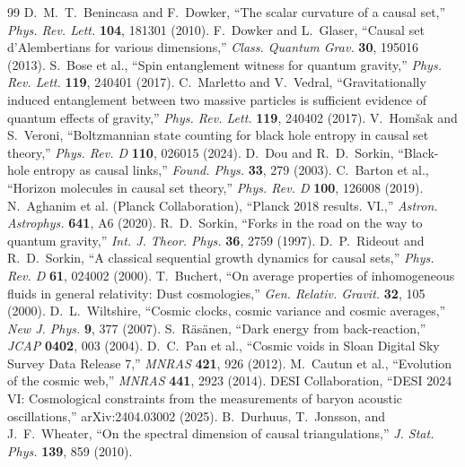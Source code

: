 \documentclass[11pt]{article}
\begin{document}
\begin{thebibliography}{99}
 D.~M.~T.~Benincasa and F.~Dowker, ``The scalar curvature of a causal set,'' \emph{Phys. Rev. Lett.} \textbf{104}, 181301 (2010).
 F.~Dowker and L.~Glaser, ``Causal set d'Alembertians for various dimensions,'' \emph{Class. Quantum Grav.} \textbf{30}, 195016 (2013).
 S.~Bose et al., ``Spin entanglement witness for quantum gravity,'' \emph{Phys. Rev. Lett.} \textbf{119}, 240401 (2017).
 C.~Marletto and V.~Vedral, ``Gravitationally induced entanglement between two massive particles is sufficient evidence of quantum effects of gravity,'' \emph{Phys. Rev. Lett.} \textbf{119}, 240402 (2017).
 V.~Hom\v{s}ak and S.~Veroni, ``Boltzmannian state counting for black hole entropy in causal set theory,'' \emph{Phys. Rev. D} \textbf{110}, 026015 (2024).
 D.~Dou and R.~D.~Sorkin, ``Black-hole entropy as causal links,'' \emph{Found. Phys.} \textbf{33}, 279 (2003).
 C.~Barton et al., ``Horizon molecules in causal set theory,'' \emph{Phys. Rev. D} \textbf{100}, 126008 (2019).
 N.~Aghanim et al. (Planck Collaboration), ``Planck 2018 results. VI.,'' \emph{Astron. Astrophys.} \textbf{641}, A6 (2020).
 R.~D.~Sorkin, ``Forks in the road on the way to quantum gravity,'' \emph{Int. J. Theor. Phys.} \textbf{36}, 2759 (1997).
 D.~P.~Rideout and R.~D.~Sorkin, ``A classical sequential growth dynamics for causal sets,'' \emph{Phys. Rev. D} \textbf{61}, 024002 (2000).
 T.~Buchert, ``On average properties of inhomogeneous fluids in general relativity: Dust cosmologies,'' \emph{Gen. Relativ. Gravit.} \textbf{32}, 105 (2000).
 D.~L.~Wiltshire, ``Cosmic clocks, cosmic variance and cosmic averages,'' \emph{New J. Phys.} \textbf{9}, 377 (2007).
 S.~R\"as\"anen, ``Dark energy from back-reaction,'' \emph{JCAP} \textbf{0402}, 003 (2004).
 D.~C.~Pan et al., ``Cosmic voids in Sloan Digital Sky Survey Data Release 7,'' \emph{MNRAS} \textbf{421}, 926 (2012).
 M.~Cautun et al., ``Evolution of the cosmic web,'' \emph{MNRAS} \textbf{441}, 2923 (2014).
 DESI Collaboration, ``DESI 2024 VI: Cosmological constraints from the measurements of baryon acoustic oscillations,'' arXiv:2404.03002 (2025).
 B.~Durhuus, T.~Jonsson, and J.~F.~Wheater, ``On the spectral dimension of causal triangulations,'' \emph{J. Stat. Phys.} \textbf{139}, 859 (2010).
\end{thebibliography}
\end{document}
